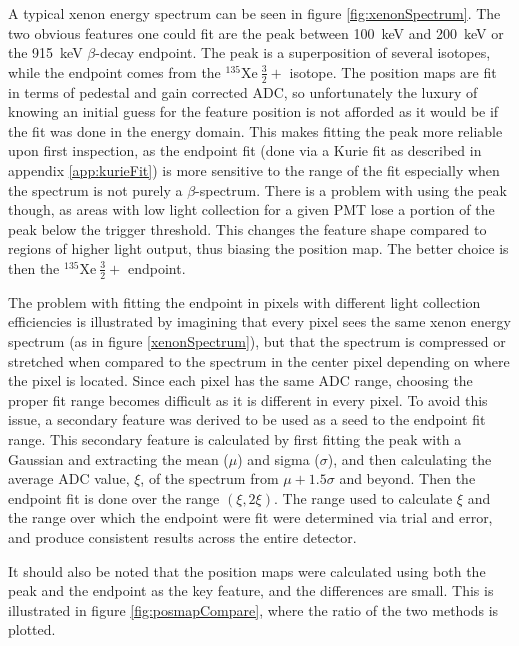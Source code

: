 A typical xenon energy spectrum can be seen in figure \ref{fig:xenonSpectrum}. The two obvious features one could
fit are the peak between 100~keV and 200~keV or the 915~keV $\beta$-decay endpoint. The peak is a
superposition of several isotopes, while the endpoint comes from the
$^{135}\mathrm{Xe~}\frac{3}{2}+$ isotope. The position maps are fit in terms of pedestal and gain corrected ADC,
so unfortunately the luxury of knowing an initial guess for the feature position is not afforded as it would
be if the fit was done in the energy domain. This makes
fitting the peak more reliable upon first inspection, as the endpoint fit (done via a Kurie fit as described
in appendix \ref{app:kurieFit}) is more sensitive to the range of the fit especially when the spectrum is not
purely a $\beta$-spectrum. There is a problem with using the peak though, as areas with low light collection
for a given PMT lose a portion of the peak below the trigger threshold. This changes the feature shape
compared to regions of higher light output, thus biasing the position map. The better choice is then the
$^{135}\mathrm{Xe~}\frac{3}{2}+$ endpoint. 

The problem with fitting the endpoint in pixels with different light collection efficiencies is illustrated by
imagining that every pixel sees the same xenon energy spectrum (as in figure \ref{xenonSpectrum}), but that
the spectrum is compressed or stretched when compared to the spectrum in the center pixel depending on where
the pixel is located. Since each pixel has the same ADC range, choosing the proper fit range becomes difficult
as it is different in every pixel. To avoid this issue, a secondary feature was derived to be used as a
seed to the endpoint fit range. This secondary feature is calculated by first fitting the peak with a Gaussian
and extracting the mean ($\mu$) and sigma ($\sigma$), and then calculating the average ADC value, $\xi$, of the spectrum
from $\mu+1.5\sigma$ and beyond. Then the endpoint fit is done over the range $(\xi,2\xi)$. The range used to
calculate $\xi$ and the range over which the endpoint were fit were determined via trial and error, and produce
consistent results across the entire detector.

It should also be noted that the position maps were calculated using both the peak and the endpoint as the key
feature, and the differences are small. This is illustrated in figure \ref{fig:posmapCompare}, where the
ratio of the two methods is plotted.



